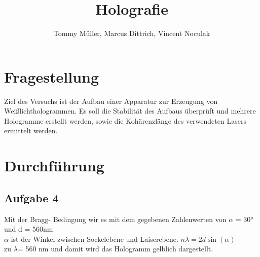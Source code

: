 \documentclass[10pt,a4paper]{article}
\author{Tommy Müller, Marcus Dittrich, Vincent Noculak}
\title{Holografie}
\begin{document}
\section{Fragestellung}

Ziel des Versuchs ist der Aufbau einer Apparatur zur Erzeugung von Weißlichthologrammen. Es soll die Stabilität des Aufbaus überprüft und mehrere Hologramme erstellt werden, sowie die Kohärenzlänge des verwendeten Lasers ermittelt werden.

\section{Durchführung}


\subsection{Aufgabe 4}
Mit der Bragg- Bedingung wir es mit dem gegebenen Zahlenwerten von $\alpha $ = 30° und d = 560nm\\
$\alpha $ ist der Winkel zwischen Sockelebene und Laiserebene.
$n \lambda= 2d \sin(\alpha) $
\\
zu $\lambda$= 560 nm und damit wird das Hologramm gelblich dargestellt.
\end{document}
